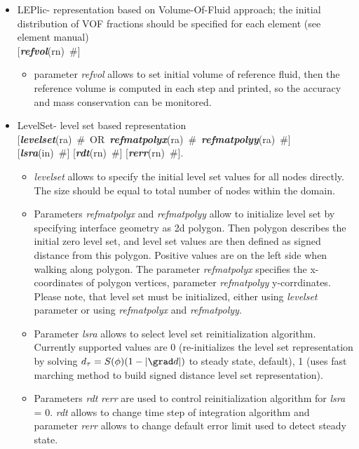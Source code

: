 \documentclass[draft]{article}
\newcommand{\param}[1]{{\em #1}}
\newcommand{\keywordnotype}[1]{\mbox{{\it{\bf{#1}}}}}
\newcommand{\keyword}[2]{\mbox{{\keywordnotype{#1}\tiny (#2)}}}
\newcommand{\field}[2]{\mbox{\keyword{#1}{#2}~\#}}
\newcommand{\optField}[2]{\mbox{[\field{#1}{#2}]}}
\begin{document}
\begin{itemize}
\item LEPlic- representation based on Volume-Of-Fluid approach; the initial distribution of VOF fractions should be specified for each element (see element manual)\\
\optField{refvol}{rn}
\begin{itemize}
\item
parameter \param{refvol} allows to set initial volume of reference fluid, then the reference volume is computed in each step and printed, so the accuracy and mass conservation can be monitored.
\end{itemize}
\item[]
LevelSet- level set based representation\\
\mbox{[\field{levelset}{ra} OR \field{refmatpolyx}{ra} \field{refmatpolyy}{ra}]}\\ \optField{lsra}{in} \optField{rdt}{rn} \optField{rerr}{rn}.
\begin{itemize}
\item \param{levelset} allows to specify the initial level set values for all nodes directly. The size should be equal to total number of nodes within the domain. 
\item Parameters \param{refmatpolyx} and \param{refmatpolyy} allow to initialize level set by specifying interface geometry as 2d polygon. Then polygon describes the initial zero level set, and level set values are then defined as signed distance from this polygon. Positive values are on the left side when walking along polygon. The parameter \param{refmatpolyx} specifies the x-coordinates of polygon vertices, parameter \param{refmatpolyy} y-corrdinates. Please note, that level set must be initialized, either using \param{levelset} parameter or using \param{refmatpolyx} and \param{refmatpolyy}.
\item Parameter \param{lsra} allows to select level set reinitialization algorithm. Currently supported values are 0 (re-initializes the level set representation by solving $d_{\tau} = S(\phi)(1-\vert\grad d\vert)$ to steady state, default), 1 (uses fast  marching method to build signed distance level set representation).
\item Parameters \param{rdt} \param{rerr} are used to control reinitialization algorithm for \param{lsra} = 0. \param{rdt} allows to change time step of integration algorithm and parameter \param{rerr} allows to change default error limit used to detect steady state.
\end{itemize}
\end{itemize}
\end{document}
